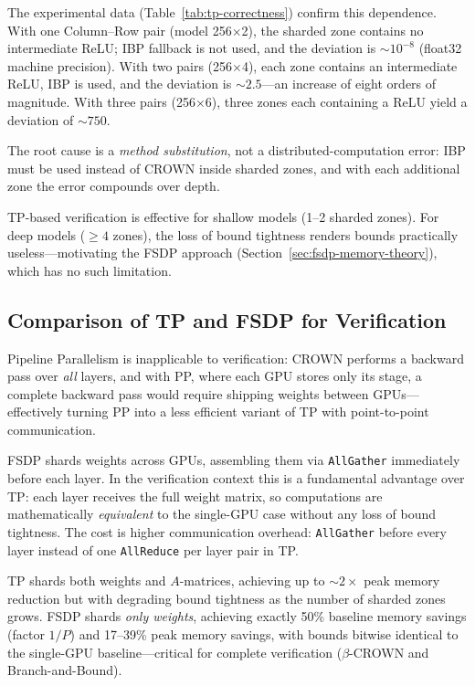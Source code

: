 The experimental data (Table~\ref{tab:tp-correctness}) confirm this dependence.
With one Column--Row pair (model 256$\times$2), the sharded zone contains no
intermediate ReLU; IBP fallback is not used, and the deviation is
$\sim\!10^{-8}$ (float32 machine precision). With two pairs (256$\times$4),
each zone contains an intermediate ReLU, IBP is used, and the deviation is
$\sim\!2.5$---an increase of eight orders of magnitude. With three pairs
(256$\times$6), three zones each containing a ReLU yield a deviation of
$\sim\!750$.

The root cause is a \textit{method substitution}, not a distributed-computation
error: IBP must be used instead of CROWN inside sharded zones, and with each
additional zone the error compounds over depth.

TP-based verification is effective for shallow models (1--2 sharded zones).
For deep models ($\geq\!4$ zones), the loss of bound tightness renders
bounds practically useless---motivating the FSDP approach
(Section~\ref{sec:fsdp-memory-theory}), which has no such limitation.

\subsection{Comparison of TP and FSDP for Verification}

Pipeline Parallelism is inapplicable to verification: CROWN performs a backward
pass over \textit{all} layers, and with PP, where each GPU stores only its
stage, a complete backward pass would require shipping weights between GPUs---
effectively turning PP into a less efficient variant of TP with point-to-point
communication.

FSDP shards weights across GPUs, assembling them via \texttt{AllGather}
immediately before each layer. In the verification context this is a fundamental
advantage over TP: each layer receives the full weight matrix, so computations
are mathematically \textit{equivalent} to the single-GPU case without any loss
of bound tightness. The cost is higher communication overhead:
\texttt{AllGather} before every layer instead of one \texttt{AllReduce} per
layer pair in TP.

TP shards both weights and $A$-matrices, achieving up to ${\sim}2\times$ peak
memory reduction but with degrading bound tightness as the number of sharded
zones grows. FSDP shards \textit{only weights}, achieving exactly 50\% baseline
memory savings (factor $1/P$) and 17--39\% peak memory savings, with bounds
bitwise identical to the single-GPU baseline---critical for complete verification
($\beta$-CROWN and Branch-and-Bound).

